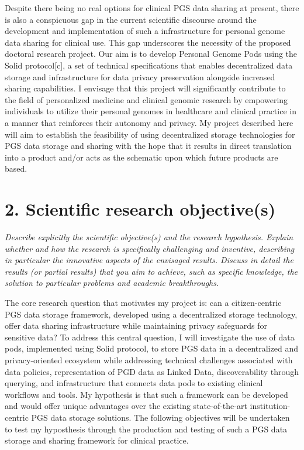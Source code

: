 \documentclass[11pt]{article}
\begin{document}
Despite there being no real options for clinical PGS data sharing at present, there is also a conspicuous gap in the current scientific discourse around the development and implementation of such a infrastructure for personal genome data sharing for clinical use. 
This gap underscores the necessity of the proposed doctoral research project.
Our aim is to develop Personal Genome Pods using the Solid protocol[c], a set of technical specifications that enables decentralized data storage and infrastructure for data privacy preservation alongside increased sharing capabilities.  
I envisage that this project will significantly contribute to the field of personalized medicine and clinical genomic research by empowering individuals to utilize their personal genomes in healthcare and clinical practice in a manner that reinforces their autonomy and privacy. 
My project described here will aim to establish the feasibility of using decentralized storage technologies for PGS data storage and sharing with the hope that it results in direct translation into a product and/or acts as the schematic upon which future products are based. 


\section{2. Scientific research objective(s)}
\textit{Describe explicitly the scientific objective(s) and the research hypothesis. Explain whether and how the research is specifically challenging and inventive, describing in particular the innovative aspects of the envisaged results. Discuss in detail the results (or partial results) that you aim to achieve, such as specific knowledge, the solution to particular problems and academic breakthroughs.}

The core research question that motivates my project is: can a citizen-centric PGS data storage framework, developed using a decentralized storage technology, offer data sharing infrastructure while maintaining privacy safeguards for sensitive data? 
To address this central question, I will investigate the use of data pods, implemented using Solid protocol, to store PGS data in a decentralized and privacy-oriented ecosystem while addressing technical challenges associated with data policies, representation of PGD data as Linked Data, discoverability through querying, and infrastructure that connects data pods to existing clinical workflows and tools. 
My hypothesis is that such a framework can be developed and would offer unique advantages over the existing state-of-the-art institution-centric PGS data storage solutions. 
The following objectives will be undertaken to test my hyposthesis through the production and testing of such a PGS data storage and sharing framework for clinical practice.
\end{document}
